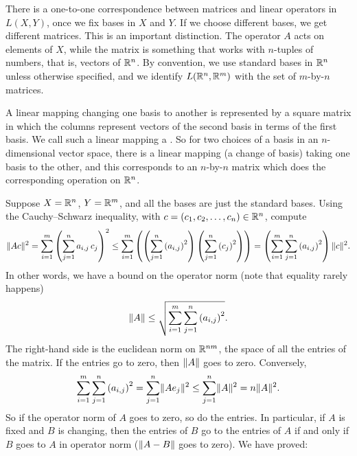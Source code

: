 There is a one-to-one correspondence between matrices and linear operators in
$L(X,Y)$, once we fix bases in $X$ and $Y$.  If we 
choose different bases, we get different matrices.
This is an important distinction.
The operator $A$ acts on elements of $X$, while the matrix
is something that works with $n$-tuples of numbers, that is, vectors of
${\mathbb{R}}^n$.  By convention, we use standard bases in ${\mathbb{R}}^n$ unless otherwise
specified, and we identify $L({\mathbb{R}}^n,{\mathbb{R}}^m)$ with the set of $m$-by-$n$ matrices.

A linear mapping changing one basis to another is represented by a
square matrix in which the columns represent vectors
of the second basis in terms of the first basis.  We call such a linear
mapping a \emph{}.  So for two choices of a
basis in an $n$-dimensional vector space, there is a linear mapping
(a change of basis)
taking one basis to the other, and this corresponds to an $n$-by-$n$
matrix which does the corresponding operation on ${\mathbb{R}}^n$.

\medskip

Suppose
$X={\mathbb{R}}^n$, $Y={\mathbb{R}}^m$, and
all the bases are just the standard bases.
Using the Cauchy--Schwarz inequality, with $c=(c_1,c_2,\ldots,c_n) \in {\mathbb{R}}^n$, compute
\begin{equation*}
\lVert {Ac} \rVert^2
=
\sum_{i=1}^m { \left(\sum_{j=1}^n a_{i,j} \, c_j \right)}^2
\leq
\sum_{i=1}^m
\left(
\left(\sum_{j=1}^n {(a_{i,j})}^2 \right)
\left(\sum_{j=1}^n {(c_j)}^2 \right)
\right)
=
\left(
\sum_{i=1}^m \sum_{j=1}^n {(a_{i,j})}^2 \right)
\lVert {c} \rVert^2 .
\end{equation*}
In other words, we have a bound on the operator norm (note that equality
rarely happens)
\begin{equation*}
\lVert {A} \rVert \leq
\sqrt{\sum_{i=1}^m \sum_{j=1}^n {(a_{i,j})}^2} .
\end{equation*}
The right-hand side is the euclidean norm on ${\mathbb{R}}^{nm}$, the space
of all the entries of the matrix.
If the entries go to zero, then $\lVert {A} \rVert$ goes to zero.
Conversely,
\begin{equation*}
\sum_{i=1}^m \sum_{j=1}^n {(a_{i,j})}^2
=
\sum_{j=1}^n \lVert {A e_j} \rVert^2
\leq
\sum_{j=1}^n \lVert {A} \rVert^2
= n \lVert {A} \rVert^2 .
\end{equation*}
So if the operator norm of $A$ goes to zero, so do the entries.
In particular, if $A$ is fixed and $B$ is changing,
then the entries of $B$ go to the entries of $A$ if and only if $B$ goes to $A$ in
operator norm ($\lVert {A-B} \rVert$ goes to zero).  We have proved:

